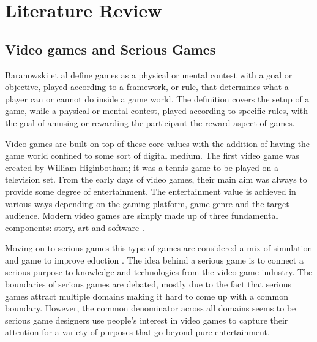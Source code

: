 
\section{Literature Review}

\subsection{Video games and Serious Games}

Baranowski et al \cite{yuserious} define games as a physical or mental contest with a goal or objective, played according to a framework, or rule, that determines what a player can or cannot do inside a game world. The definition covers the setup of a game, while a physical or mental contest, played according to specific rules, with the goal of amusing or rewarding the participant the reward aspect of games.

Video games are built on top of these core values with the addition of having the game world confined to some sort of digital medium. The first video game was created by William Higinbotham; it was a tennis game to be played on a television set\cite{stanton2015brief}. From the early days of video games, their main aim was always to provide some degree of entertainment. The entertainment value is achieved in various ways depending on the gaming platform, game genre and the target audience. Modern video games are simply made up of three fundamental components: story, art and software \cite{zyda2005visual}.

Moving on to serious games this type of games are considered a mix of simulation and game to improve eduction \cite{abt1970}. The idea behind a serious game is to connect a serious purpose to knowledge and technologies from the video game industry\cite{michael2005serious}. The boundaries of serious games are debated, mostly due to the fact that serious games attract multiple domains making it hard to come up with a common boundary. However, the common denominator across all domains seems to be serious game designers use people's interest in video games to capture their attention for a variety of purposes that go beyond pure entertainment\cite{djaouti2011classifying}.

